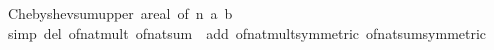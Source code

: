 \begin{isabellebody}
%
\isadelimproof
%
\endisadelimproof
%
\isatagproof
{}\isamarkupfalse%
\ Chebyshev{\isacharunderscore}{\kern0pt}sum{\isacharunderscore}{\kern0pt}upper{\isacharbrackleft}{\kern0pt}\ {\isacharprime}{\kern0pt}a{\isacharequal}{\kern0pt}real{\isacharcomma}{\kern0pt}\ of\ n\ a\ b{\isacharbrackright}{\kern0pt}\isanewline
{}\isamarkupfalse%
\ {\isacharparenleft}{\kern0pt}simp\ del{\isacharcolon}{\kern0pt}\ of{\isacharunderscore}{\kern0pt}nat{\isacharunderscore}{\kern0pt}mult\ of{\isacharunderscore}{\kern0pt}nat{\isacharunderscore}{\kern0pt}sum\ \ add{\isacharcolon}{\kern0pt}\ of{\isacharunderscore}{\kern0pt}nat{\isacharunderscore}{\kern0pt}mult{\isacharbrackleft}{\kern0pt}symmetric{\isacharbrackright}{\kern0pt}\ of{\isacharunderscore}{\kern0pt}nat{\isacharunderscore}{\kern0pt}sum{\isacharbrackleft}{\kern0pt}symmetric{\isacharbrackright}{\kern0pt}{\isacharparenright}{\kern0pt}%
\endisatagproof
{\isafoldproof}%
%
\isadelimproof
\isanewline
%
\endisadelimproof
%
\isadelimtheory
\isanewline
%
\endisadelimtheory
%
\isatagtheory
{}\isamarkupfalse%
%
\endisatagtheory
{\isafoldtheory}%
%
\isadelimtheory
%
\endisadelimtheory
%
\end{isabellebody}%
\endinput
